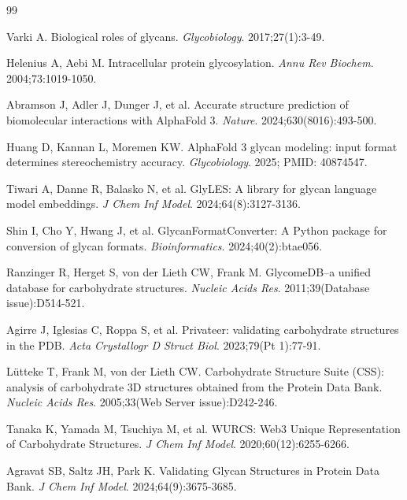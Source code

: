 \documentclass[11pt,a4paper]{article}
\begin{document}
\begin{thebibliography}{99}

Varki A. Biological roles of glycans. \textit{Glycobiology}. 2017;27(1):3-49.

Helenius A, Aebi M. Intracellular protein glycosylation. \textit{Annu Rev Biochem}. 2004;73:1019-1050.

Abramson J, Adler J, Dunger J, et al. Accurate structure prediction of biomolecular interactions with AlphaFold 3. \textit{Nature}. 2024;630(8016):493-500.

Huang D, Kannan L, Moremen KW. AlphaFold 3 glycan modeling: input format determines stereochemistry accuracy. \textit{Glycobiology}. 2025; PMID: 40874547.

Tiwari A, Danne R, Balasko N, et al. GlyLES: A library for glycan language model embeddings. \textit{J Chem Inf Model}. 2024;64(8):3127-3136.

Shin I, Cho Y, Hwang J, et al. GlycanFormatConverter: A Python package for conversion of glycan formats. \textit{Bioinformatics}. 2024;40(2):btae056.

Ranzinger R, Herget S, von der Lieth CW, Frank M. GlycomeDB--a unified database for carbohydrate structures. \textit{Nucleic Acids Res}. 2011;39(Database issue):D514-521.

Agirre J, Iglesias C, Roppa S, et al. Privateer: validating carbohydrate structures in the PDB. \textit{Acta Crystallogr D Struct Biol}. 2023;79(Pt 1):77-91.

L\"utteke T, Frank M, von der Lieth CW. Carbohydrate Structure Suite (CSS): analysis of carbohydrate 3D structures obtained from the Protein Data Bank. \textit{Nucleic Acids Res}. 2005;33(Web Server issue):D242-246.

Tanaka K, Yamada M, Tsuchiya M, et al. WURCS: Web3 Unique Representation of Carbohydrate Structures. \textit{J Chem Inf Model}. 2020;60(12):6255-6266.

Agravat SB, Saltz JH, Park K. Validating Glycan Structures in Protein Data Bank. \textit{J Chem Inf Model}. 2024;64(9):3675-3685.

\end{thebibliography}
\end{document}
